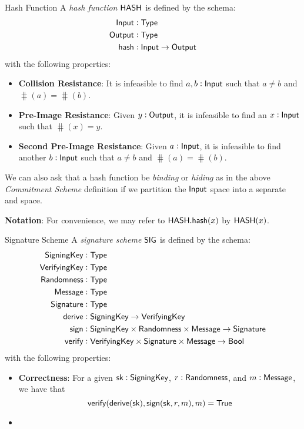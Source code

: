 \begin{definitiontoc}{Hash Function}
    A \emph{hash function} ${\textsf{HASH}}$ is defined by the schema:
    \begin{align*}
        {\textsf{Input}}  &: {\textsf{Type}} \\
        {\textsf{Output}} &: {\textsf{Type}} \\
        {\textsf{hash}}   &: {\textsf{Input}} \to {\textsf{Output}}
    \end{align*}
    with the following properties:
    \begin{itemize}
        \item \textbf{Collision Resistance}: It is infeasible to find $a, b : {\textsf{Input}}$ such that $a \ne b$ and $\hash(a) = \hash(b)$.
        \item \textbf{Pre-Image Resistance}: Given $y : {\textsf{Output}}$, it is infeasible to find an $x : {\textsf{Input}}$ such that $\hash(x) = y$.
        \item \textbf{Second Pre-Image Resistance}: Given $a : {\textsf{Input}}$, it is infeasible to find another $b : {\textsf{Input}}$ such that $a \ne b$ and $\hash(a) = \hash(b)$.
    \end{itemize}

    We can also ask that a hash function be \emph{binding} or \emph{hiding} as in the above \emph{Commitment Scheme} definition if we partition the ${\textsf{Input}}$ space into a separate \Randomness{} and \Input{} space.

    \textbf{Notation}: For convenience, we may refer to ${\textsf{HASH}}.{\textsf{hash}}(x)$ by ${\textsf{HASH}}(x)$.
\end{definitiontoc}

\begin{definitiontoc}{Signature Scheme}
    A \emph{signature scheme} ${\textsf{SIG}}$ is defined by the schema:
    \begin{align*}
        {\textsf{SigningKey}}   &: {\textsf{Type}} \\
        {\textsf{VerifyingKey}} &: {\textsf{Type}} \\
        {\textsf{Randomness}}   &: {\textsf{Type}} \\
        {\textsf{Message}}      &: {\textsf{Type}} \\
        {\textsf{Signature}}    &: {\textsf{Type}} \\
        {\textsf{derive}}       &: {\textsf{SigningKey}} \to {\textsf{VerifyingKey}} \\
        {\textsf{sign}}         &: {\textsf{SigningKey}} \times {\textsf{Randomness}} \times {\textsf{Message}} \to {\textsf{Signature}} \\
        {\textsf{verify}}       &: {\textsf{VerifyingKey}} \times {\textsf{Signature}} \times {\textsf{Message}} \to {\textsf{Bool}}
    \end{align*}
    with the following properties:
    \begin{itemize}
        \item \textbf{Correctness}: For a given ${\textsf{sk}} : {\textsf{SigningKey}}$, $r : {\textsf{Randomness}}$, and $m : {\textsf{Message}}$, we have that 
            \[{\textsf{verify}}({\textsf{derive}}({\textsf{sk}}), {\textsf{sign}}({\textsf{sk}}, r, m), m) = {\textsf{True}}\]
        \item \TODO{}
    \end{itemize}
\end{definitiontoc}

